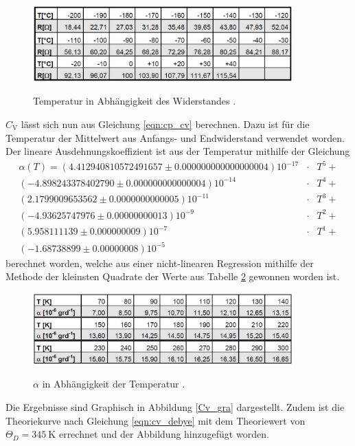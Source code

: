 \begin{figure}[!h]
	\centering
	\caption[]{Temperatur in Abhängigkeit des Widerstandes \cite{V47}.}
	\includegraphics[width = 10cm]{img/temperatur.png}	
	\label{Temperatur}
\end{figure}

$C_\mathrm{V}$ lässt sich nun aus Gleichung \eqref{eqn:cp_cv} 
berechnen.
Dazu ist für die Temperatur der Mittelwert aus Anfangs- und Endwiderstand verwendet worden.
Der lineare Ausdehnungskoeffizient ist aus der Temperatur mithilfe der Gleichung
\begin{eqnarray*}
	\alpha(T) = 
	(4.412940810572491657\pm0.000000000000000004)10^{-17} &\cdot& T^5 +\\
	(-4.898243378402790\pm0.000000000000004)10^{-14} &\cdot& T^4 + \\
	(2.1799009653562\pm0.0000000000005)10^{-11} &\cdot& T^3 + \\
	(-4.93625747976\pm0.00000000013)10^{-9} &\cdot& T^2 + \\
	(5.958111139\pm0.000000009)10^{-7} &\cdot& T^1 + \\
	(-1.68738899\pm0.00000008)10^{-5} &&
\end{eqnarray*}
berechnet worden, welche aus einer nicht-linearen Regression mithilfe der Methode der kleinsten Quadrate der Werte aus Tabelle \ref{Alpha} gewonnen worden ist.

\begin{figure}[!h]
	\centering
	\caption[]{$\alpha$ in Abhängigkeit der Temperatur \cite{V47}.}
	\includegraphics[width = 10cm]{img/alpha.png}	
	\label{Alpha}
\end{figure}

Die Ergebnisse sind Graphisch in Abbildung \ref{Cv_gra} dargestellt.
Zudem ist die Theoriekurve nach Gleichung \eqref{eqn:cv_debye} mit dem Theoriewert von $\Theta_D = \SI{345}{\kelvin}$ \cite{kupfer3}errechnet und der Abbildung hinzugefügt worden.

